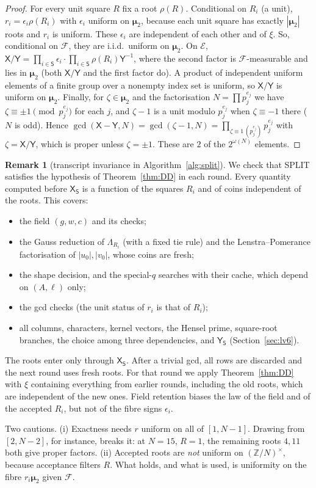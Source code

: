 \documentclass[11pt]{amsart}
\theoremstyle{definition}
\newtheorem{remark}[theorem]{Remark}
\newcommand{\Z}{\mathbb{Z}}
\newcommand{\cE}{\mathcal{E}}
\newcommand{\cF}{\mathcal{F}}
\newcommand{\sS}{\mathsf{S}}
\newcommand{\sX}{\mathsf{X}}
\newcommand{\sY}{\mathsf{Y}}
\newcommand{\bmu}{\boldsymbol{\mu}_2}
\begin{document}
\begin{proof}
For every unit square $R$ fix a root $\rho(R)$. Conditional on $R_i$ (a unit), $r_i=\epsilon_i\rho(R_i)$ with $\epsilon_i$ uniform on
$\bmu$, because each unit square has exactly $|\bmu|$ roots and $r_i$ is uniform. These $\epsilon_i$ are independent of
each other and of $\xi$. So, conditional on $\cF$, they are i.i.d.\ uniform on $\bmu$. On $\cE$,
$\sX/\sY=\prod_{i\in\sS}\epsilon_i\cdot\prod_{i\in\sS}\rho(R_i)\sY^{-1}$, where the second factor is $\cF$-measurable and lies in
$\bmu$ (both $\sX/\sY$ and the first factor do). A product of independent uniform elements of a finite group over a nonempty
index set is uniform, so $\sX/\sY$ is uniform on $\bmu$. Finally, for $\zeta\in\bmu$ and the
factorisation $N=\prod p_j^{e_j}$ we have $\zeta\equiv\pm1\pmod{p_j^{e_j}}$ for each $j$, and $\zeta-1$ is a unit modulo
$p_j^{e_j}$ when $\zeta\equiv-1$ there ($N$ is odd). Hence $\gcd(\sX-\sY,N)=\gcd(\zeta-1,N)=\prod_{\zeta\equiv1\,(p_j^{e_j})}p_j^{e_j}$ with
$\zeta=\sX/\sY$, which is proper unless $\zeta=\pm1$. These are $2$ of the $2^{\omega(N)}$ elements.
\end{proof}

\begin{remark}[transcript invariance in Algorithm~\ref{alg:split}]\label{rem:T}
We check that SPLIT satisfies the hypothesis of Theorem~\ref{thm:DD} in each round. Every
quantity computed before $\sX_\sS$ is a function of the squares $R_i$ and of coins independent of the roots. This covers:
\begin{itemize}
\item the field $(g,w,c)$ and its checks;
\item the Gauss reduction of $\Lambda_{R_i}$ (with a fixed tie rule) and the Lenstra--Pomerance factorisation of $|u_0|,|v_0|$,
  whose coins are fresh;
\item the shape decision, and the special-$q$ searches with their cache, which depend on $(A,\ell)$ only;
\item the gcd checks (the unit status of $r_i$ is that of $R_i$);
\item all columns, characters, kernel vectors, the Hensel prime, square-root branches, the choice among three dependencies, and
  $\sY_\sS$ (Section~\ref{sec:lv6}).
\end{itemize}
The roots enter only through $\sX_\sS$. After a trivial gcd, all rows are discarded and the next round
uses fresh roots. For that round we apply Theorem~\ref{thm:DD} with $\xi$ containing everything from earlier rounds, including the
old roots, which are independent of the new ones. Field retention biases the law of the field and of
the accepted $R_i$, but not of the fibre signs $\epsilon_i$.

Two cautions. (i) Exactness needs $r$ uniform on all of $[1,N-1]$. Drawing from $[2,N-2]$, for instance, breaks it: at $N=15$,
$R=1$, the remaining roots $4,11$ both give proper factors. (ii) Accepted roots are \emph{not} uniform on $(\Z/N)^\times$,
because acceptance filters $R$. What holds, and what is used, is uniformity on the fibre $r_i\bmu$ given $\cF$.
\end{remark}
\end{document}
